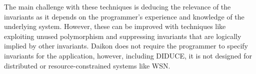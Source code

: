 The main challenge with these techniques is deducing the relevance of the invariants as it depends on the programmer's experience and knowledge of the underlying system. However, these can be improved with techniques like exploiting unused polymorphism and suppressing invariants that are logically implied by other invariants. Daikon does not require the programmer to specify invariants for the application, however, including DIDUCE, it is not designed for distributed or resource-constrained systems like WSN.

